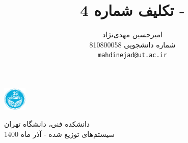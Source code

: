 \documentclass{article}
\title{تکلیف شماره 4
 - 
 \lr{Coordinated Attack, Randomized Version}}
\author{%
  امیرحسین مهدی‌نژاد\\
  شماره دانشجویی 810800058\\
  \texttt{mahdinejad@ut.ac.ir} \\
}
\begin{document}
\begin{minipage}{0.1\textwidth}%
\includegraphics[width=1.1cm]{Photos/UT_logo.png}
\end{minipage}%
\hfill%
\begin{minipage}{0.9\textwidth}\raggedleft
دانشکده فنی، دانشگاه تهران\\
سیستم‌های توزیع شده - 
آذر
ماه 1400\\
\end{minipage}

\makepertitle

\end{document}
